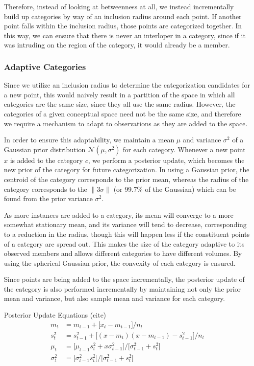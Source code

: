 \documentclass[runningheads]{llncs}
\begin{document}
Therefore, instead of looking at betweenness at all, we instead incrementally build up categories by way of an inclusion radius around each point.  If another point falls within the inclusion radius, those points are categorized together.  In this way, we can ensure that there is never an interloper in a category, since if it was intruding on the region of the category, it would already be a member.

\subsubsection{Adaptive Categories}

Since we utilize an inclusion radius to determine the categorization candidates for a new point, this would naively result in a partition of the space in which all categories are the same size, since they all use the same radius.  However, the categories of a given conceptual space need not be the same size, and therefore we require  a mechanism to adapt to observations as they are added to the space.

In order to ensure this adaptability, we maintain a mean $\mu$ and variance $\sigma^2$ of a Gaussian prior distribution $\mathcal{N}(\mu,\sigma^2)$ for each category.  Whenever a new point $x$ is added to the category $c$, we perform a posterior update, which becomes the new prior of the category for future categorization.  In using a Gaussian prior, the centroid of the category corresponds to the prior mean, whereas the radius of the category corresponds to the $\|3\sigma\|$ (or 99.7\% of the Gaussian) which can be found from the prior variance $\sigma^2$.

As more instances are added to a category, its mean will converge to a more somewhat stationary mean, and its variance will tend to decrease, corresponding to a reduction in the radius, though this will happen less if the constituent points of a category are spread out.  This makes the size of the category adaptive to its observed members and allows different categories to have different volumes.  By using the spherical Gaussian prior, the convexity of each category is ensured.

Since points are being added to the space incrementally, the posterior update of the category is also performed incrementally by maintaining not only the prior mean and variance, but also sample mean and variance for each category.

Posterior Update Equations (cite)
  \begin{align}
    m_t &= m_{t-1} + \big[ x_t - m_{t-1} \big] / n_t 
      \tag*{(Sample Mean)} \\
    s_t^2 &= s_{t-1}^2 + \big[ (x - m_t)(x - m_{t-1}) - s_{t-1}^2 \big] / n_t
      \tag*{(Sample Variance)} \\
    \mu_t &= \big[ \mu_{t-1} s_t^2 + x \sigma_{t-1}^2 \big] / \big[ \sigma_{t-1}^2 + s_t^2 \big]
      \tag*{(Posterior Mean)} \\
    \sigma_t^2 &= \big[ \sigma_{t-1}^2 s_t^2 \big] / \big[ \sigma_{t-1}^2 + s_t^2 \big]
      \tag*{(Posterior Variance)}
  \end{align}
\end{document}
